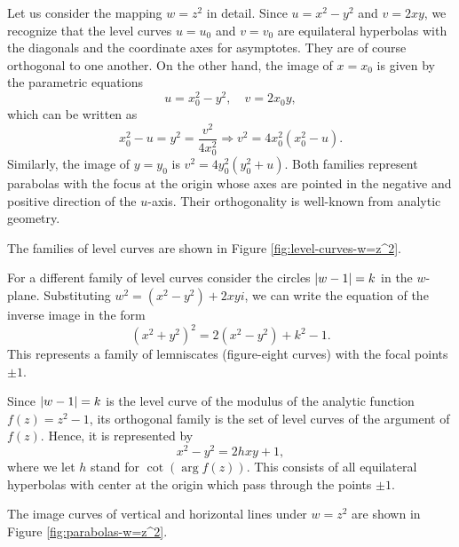 \begin{example}
    Let us consider the mapping $w=z^2$ in detail. Since $u=x^2-y^2$ and $v=2xy$, we recognize that the level curves $u=u_0$ and $v=v_0$ are equilateral hyperbolas with the diagonals and the coordinate axes for asymptotes. They are of course orthogonal to one another. On the other hand, the image of $x=x_0$ is given by the parametric equations $$u=x_0^2-y^2, \quad v=2x_0y,$$ which can be written as $$x_0^2-u=y^2=\dfrac{v^2}{4x_0^2} \Rightarrow v^2=4x_0^2(x_0^2-u).$$ Similarly, the image of $y=y_0$ is $v^2=4y_0^2(y_0^2+u)$. Both families represent parabolas with the focus at the origin whose axes are pointed in the negative and positive direction of the $u$-axis. Their orthogonality is well-known from analytic geometry.

    The families of level curves are shown in Figure \ref{fig:level-curves-w=z^2}.

    For a different family of level curves consider the circles $\lvert w-1 \rvert=k$ in the $w$-plane. Substituting $w^2=(x^2-y^2)+2xyi$, we can write the equation of the inverse image in the form $$(x^2+y^2)^2=2(x^2-y^2)+k^2-1.$$ This represents a family of lemniscates (figure-eight curves) with the focal points $\pm 1$.

    Since $\lvert w-1 \rvert=k$ is the level curve of the modulus of the analytic function $f(z)=z^2-1$, its orthogonal family is the set of level curves of the argument of $f(z)$. Hence, it is represented by $$x^2-y^2=2hxy+1,$$ where we let $h$ stand for $\cot(\arg f(z))$. This consists of all equilateral hyperbolas with center at the origin which pass through the points $\pm 1$.
\end{example}

The image curves of vertical and horizontal lines under $w = z^2$ are shown in Figure \ref{fig:parabolas-w=z^2}.

